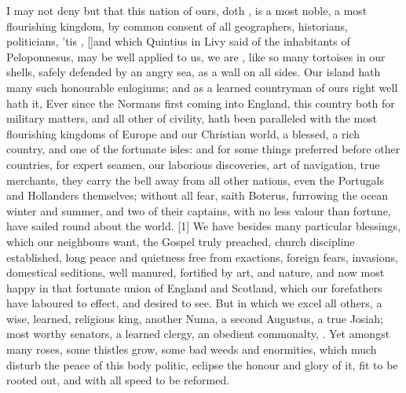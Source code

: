 {I may not deny but that this nation of ours, doth , is a most noble, a most flourishing kingdom, by common consent
of all geographers, historians, politicians, 'tis ,
[\baselineskip]and which Quintius in Livy said of the inhabitants of
Peloponnesus, may be well applied to us, we are , like so many tortoises in our shells, safely defended by an
angry sea, as a wall on all sides. Our island hath many such honourable
eulogiums; and as a learned countryman of ours right well hath it,
Ever since the Normans first coming into England, this country
both for military matters, and all other of civility, hath been
paralleled with the most flourishing kingdoms of Europe and our
Christian world, a blessed, a rich country, and one of the fortunate
isles: and for some things preferred before other countries, for
expert seamen, our laborious discoveries, art of navigation, true
merchants, they carry the bell away from all other nations, even the
Portugals and Hollanders themselves; without all fear, saith
Boterus, furrowing the ocean winter and summer, and two of their
captains, with no less valour than fortune, have sailed round about the
world. [1\baselineskip] We have besides many particular blessings, which our
neighbours want, the Gospel truly preached, church discipline
established, long peace and quietness free from exactions, foreign
fears, invasions, domestical seditions, well manured, fortified by
art, and nature, and now most happy in that fortunate union of England
and Scotland, which our forefathers have laboured to effect, and
desired to see. But in which we excel all others, a wise, learned,
religious king, another Numa, a second Augustus, a true Josiah; most
worthy senators, a learned clergy, an obedient commonalty, \etc{}. Yet
amongst many roses, some thistles grow, some bad weeds and enormities,
which much disturb the peace of this body politic, eclipse the honour
and glory of it, fit to be rooted out, and with all speed to be
reformed.

}
